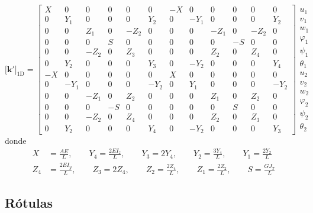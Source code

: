 \documentclass[11pt, a4paper,titlepage]{article}
\newcommand{\Mme}[1]{\boldsymbol{[}\mathbf{#1} \boldsymbol{]}}
\begin{document}
\begin{equation}\label{eq:matrizRigidezTimoshenko} \Mme{k'}_{\mathrm{1D}} = \left[\begin{array}{cccccccccccc} X & 0 & 0 & 0 & 0 & 0 & -X & 0 & 0 & 0 & 0 & 0\\ 0 & Y_{1} & 0 & 0 & 0 & Y_{2} & 0 & -Y_{1} & 0 & 0 & 0 & Y_{2}\\ 0 & 0 & Z_{1} & 0 & -Z_{2} & 0 & 0 & 0 & -Z_{1} & 0 & -Z_{2} & 0\\ 0 & 0 & 0 & S & 0 & 0 & 0 & 0 & 0 & -S & 0 & 0\\ 0 & 0 & -Z_{2} & 0 & Z_{3} & 0 & 0 & 0 & Z_{2} & 0 & Z_{4} & 0\\ 0 & Y_{2} & 0 & 0 & 0 & Y_{3} & 0 & -Y_{2} & 0 & 0 & 0 & Y_{4}\\ -X & 0 & 0 & 0 & 0 & 0 & X & 0 & 0 & 0 & 0 & 0\\ 0 & -Y_{1} & 0 & 0 & 0 & -Y_{2} & 0 & Y_{1} & 0 & 0 & 0 & -Y_{2}\\ 0 & 0 & -Z_{1} & 0 & Z_{2} & 0 & 0 & 0 & Z_{1} & 0 & Z_{2} & 0\\ 0 & 0 & 0 & -S & 0 & 0 & 0 & 0 & 0 & S & 0 & 0\\ 0 & 0 & -Z_{2} & 0 & Z_{4} & 0 & 0 & 0 & Z_{2} & 0 & Z_{3} & 0\\ 0 & Y_{2} & 0 & 0 & 0 & Y_{4} & 0 & -Y_{2} & 0 & 0 & 0 & Y_{3} \end{array}\right]\begin{array}{c}
u_1\\
v_1 \\
w_1 \\
\varphi_1 \\
\psi_1 \\
\theta_1 \\
u_2\\
v_2 \\
w_2 \\
\varphi_2 \\
\psi_2 \\
\theta_2 
\end{array}
\end{equation} 
donde  
\begin{align*}
	X&=\frac{AE}{L}, \qquad Y_4 = \frac{2EI_z}{L}, \qquad Y_3 = 2Y_4, \qquad Y_2 = \frac{3Y_4}{L} ,\qquad Y_1 = \frac{2Y_2}{L} \\
	Z_4 &= \frac{2EI_y}{L}, \qquad Z_3=2Z_4, \qquad Z_2 = \frac{2Z_4}{L}, \qquad Z_1 = \frac{2Z_2}{L}, \qquad S = \frac{G J_T}{L}
\end{align*}

\subsection*{Rótulas}
\end{document}
